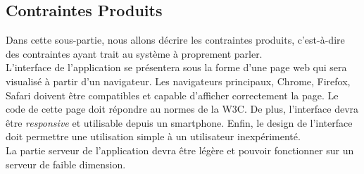 
\subsection{Contraintes Produits}
Dans cette sous-partie, nous allons décrire les contraintes produits, c'est-à-dire des contraintes ayant trait au système à proprement parler.\\

L'interface de l'application se présentera sous la forme d'une page web qui sera visualisé à partir d'un navigateur. Les navigateurs principaux, Chrome, Firefox, Safari doivent être compatibles et capable d'afficher correctement la page. Le code de cette page doit répondre au normes de la W3C. De plus, l'interface devra être \emph{responsive} et utilisable depuis un smartphone. Enfin, le design de l'interface doit permettre une utilisation simple à un utilisateur inexpérimenté.\\

La partie serveur de l'application devra être légère et pouvoir fonctionner sur un serveur de faible dimension.\\
